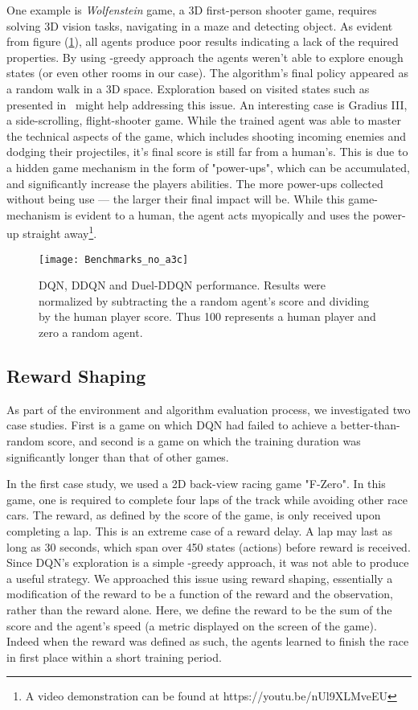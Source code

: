 \documentclass{article}
\begin{document}
One example is \textit{Wolfenstein} game, a 3D first-person shooter game, requires solving 3D vision tasks, navigating in a maze and detecting object.
As evident from figure (\ref{fig:Benchmarks_no_a3c}), all agents produce poor results indicating a lack of the required properties.
By using -greedy approach the agents weren't able to explore enough states (or even other rooms in our case). The algorithm's final policy appeared as a random walk in a 3D space. 
Exploration based on visited states such as presented in~\citet{bellemare2016unifying} might help addressing this issue.
An interesting case is Gradius III, a side-scrolling, flight-shooter game. While the trained agent was able to master the technical aspects of the game, which includes shooting incoming enemies and dodging their projectiles, it's final score is still far from a human's. This is due to a hidden game mechanism in the form of "power-ups", which can be accumulated, and significantly increase the players abilities. The more power-ups collected without being use --- the larger their final impact will be. While this game-mechanism is evident to a human, the agent acts myopically and uses the power-up straight away\footnote{A video demonstration can be found at https://youtu.be/nUl9XLMveEU}.


\begin{figure}[h]
\texttt{[image: Benchmarks\_no\_a3c]} 
\caption{DQN, DDQN and Duel-DDQN performance. Results were normalized by subtracting the a random agent's score and dividing by the human player score. Thus 100 represents a human player and zero a random agent.}
\label{fig:Benchmarks_no_a3c}
\end{figure}

\subsection{Reward Shaping} \label{reward shaping}
As part of the environment and algorithm evaluation process, we investigated two case studies. First is a game on which DQN had failed to achieve a better-than-random score, and second is a game on which the training duration was significantly longer than that of other games.

In the first case study, we used a 2D back-view racing game "F-Zero". 
In this game, one is required to complete four laps of the track while avoiding other race cars. 
The reward, as defined by the score of the game, is only received upon completing a lap. This is an extreme case of a reward delay. A lap may last as long as 30 seconds, which span over 450 states (actions) before reward is received. 
Since DQN's exploration is a simple -greedy approach, it was not able to produce a useful strategy. 
We approached this issue using reward shaping, essentially a modification of the reward to be a function of the reward and the observation, rather than the reward alone. 
Here, we define the reward to be the sum of the score and the agent's speed (a metric displayed on the screen of the game). 
Indeed when the reward was defined as such, the agents learned to finish the race in first place within a short training period.
\end{document}

